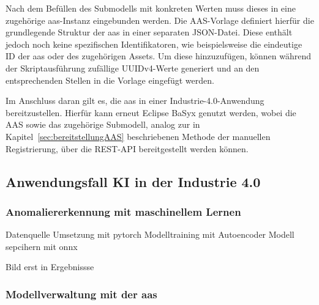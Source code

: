 Nach dem Befüllen des Submodells mit konkreten Werten muss dieses in eine zugehörige \acs{aas}-Instanz eingebunden werden. 
Die AAS-Vorlage definiert hierfür die grundlegende Struktur der \acs{aas} in einer separaten JSON-Datei. 
Diese enthält jedoch noch keine spezifischen Identifikatoren, wie beispielsweise die eindeutige ID der \acs{aas} oder des zugehörigen Assets. 
Um diese hinzuzufügen, können während der Skriptausführung zufällige UUIDv4-Werte generiert und an den entsprechenden Stellen in die Vorlage eingefügt werden.

Im Anschluss daran gilt es, die \acs{aas} in einer Industrie-4.0-Anwendung bereitzustellen. 
Hierfür kann erneut Eclipse BaSyx genutzt werden, wobei die AAS sowie das zugehörige Submodell, analog zur in Kapitel~\ref{sec:bereitstellungAAS} beschriebenen Methode der manuellen Registrierung, über die REST-API bereitgestellt werden können.


\subsection{Anwendungsfall KI in der Industrie 4.0}

\subsubsection{Anomaliererkennung mit maschinellem Lernen}
Datenquelle
Umsetzung mit pytorch
Modelltraining mit Autoencoder
Modell sepcihern mit onnx


Bild erst in Ergebnissse

\subsubsection{Modellverwaltung mit der \acs{aas}}

